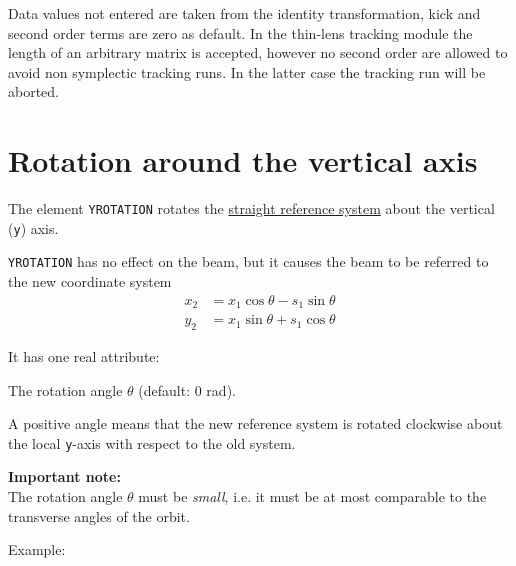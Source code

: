 {Data values not entered are taken from the identity transformation, kick
and second order terms are zero as default. In the thin-lens tracking
module the length of an arbitrary matrix is accepted, however no second
order are allowed to avoid non symplectic tracking runs. In the latter
case the tracking run will be aborted.


\section{Rotation around the vertical axis}
\label{sec:yrotation}

The element {\tt YROTATION} rotates the
\hyperref[subsec:local_straight]{straight reference system} about the
vertical ({\tt y}) axis.


{\tt YROTATION} has no effect on the beam, but it
causes the beam to be referred to the new coordinate system  \\
\begin{equation}\begin{split}
x_2 &= x_1 \cos\theta - s_1 \sin\theta \\
y_2 &= x_1 \sin\theta + s_1 \cos\theta
\end{split}\end{equation}


It has one real attribute: 
\begin{madlist}
    The rotation angle $\theta$ (default: 0 rad).  
\end{madlist}

A positive angle means that the new reference system is rotated
clockwise about the local {\tt y}-axis with respect to the old system. 

{\bf Important note:} \\
The rotation angle $\theta$ must be \emph{small}, i.e. it must be at
most comparable to the transverse angles of the orbit. 

Example: 

}
